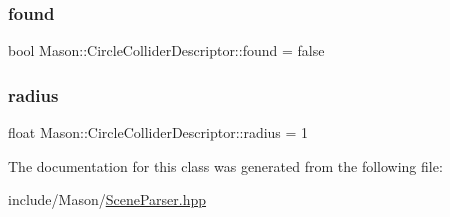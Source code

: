 \subsubsection{\texorpdfstring{found}{found}}
{\footnotesize\ttfamily bool Mason\+::\+Circle\+Collider\+Descriptor\+::found = false}

\hypertarget{class_mason_1_1_circle_collider_descriptor_a8785a58429df1c9bac9f1f482164e9f1}{}\label{class_mason_1_1_circle_collider_descriptor_a8785a58429df1c9bac9f1f482164e9f1} 
\subsubsection{\texorpdfstring{radius}{radius}}
{\footnotesize\ttfamily float Mason\+::\+Circle\+Collider\+Descriptor\+::radius = 1}



The documentation for this class was generated from the following file\+:\begin{DoxyCompactItemize}
\item 
include/\+Mason/\hyperlink{_scene_parser_8hpp}{Scene\+Parser.\+hpp}\end{DoxyCompactItemize}
